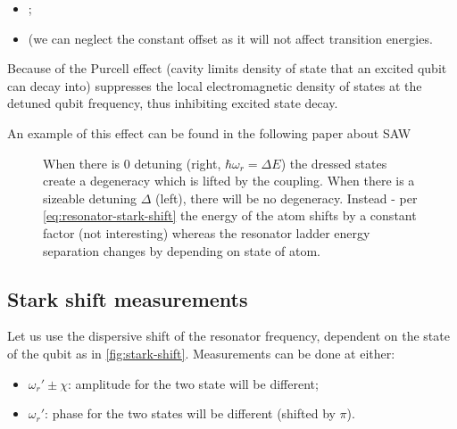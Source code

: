 \begin{framed}\noindent
   \begin{itemize}
   \item {};
   \item {} (we can neglect  the constant offset as  it will not
     affect transition energies.
   \end{itemize}

   \noindent Because of  the Purcell effect (cavity limits density  of state that
   an excited qubit can decay  into) suppresses the local electromagnetic density
   of states at the detuned qubit frequency, thus inhibiting excited state decay.
 \end{framed}

 \noindent An example  of this effect can  be found in the  following paper about
 SAW \cite{Manenti_2017}

\begin{figure}[h]
  \centering {}
  \caption{\small When  there is  0 detuning (right,  $\hbar\omega_{r}=\Delta E$)
    the dressed states create a degeneracy  which is lifted by the coupling. When
    there is  a sizeable detuning $\Delta$  (left), there will be  no degeneracy.
    Instead  -  per \autoref{eq:resonator-stark-shift}  the  energy  of the  atom
    shifts by  a constant factor  (not interesting) whereas the  resonator ladder
    energy separation  changes by   depending on
    state of atom. \label{fig:ac_stark_effect_dispersive_shift}}
\end{figure}

\newpage\subsection{Stark shift measurements}
\label{sec:stark-shift-meas}

Let us  use the  dispersive shift  of the resonator  frequency, dependent  on the
state of the qubit as in  \autoref{fig:stark-shift}.  Measurements can be done at
either:
\begin{itemize}
\item $\omega_r' \pm \chi $: amplitude for the two state will be different;
\item $\omega_r'$: phase for the two states will be different (shifted by $\pi$).
\end{itemize}

